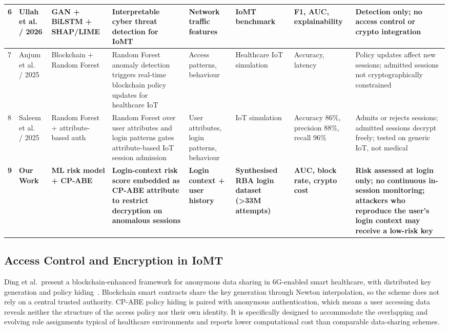 \begin{table}
{\begin{tabular}{|p{0.6cm}|p{2.5cm}|p{2.7cm}|p{3.2cm}|p{2.2cm}|p{2.2cm}|p{2.7cm}|p{2.5cm}|}
\hline
6 & Ullah et al.~\cite{ullah2025interpretable} / 2026 & GAN + BiLSTM + SHAP/LIME & Interpretable cyber threat detection for IoMT & Network traffic features & IoMT benchmark & F1, AUC, explainability & Detection only; no access control or crypto integration \\
\hline
7 & Anjum et al.~\cite{anjum2025blockchain} / 2025 & Blockchain + Random Forest & Random Forest anomaly detection triggers real-time blockchain policy updates for healthcare IoT & Access patterns, behaviour & Healthcare IoT simulation & Accuracy, latency & Policy updates affect new sessions; admitted sessions not cryptographically constrained \\
\hline
8 & Saleem et al.~\cite{saleem2025ml} / 2025 & Random Forest + attribute-based auth & Random Forest over user attributes and login patterns gates attribute-based IoT session admission & User attributes, login patterns, behaviour & IoT simulation & Accuracy 86\%, precision 88\%, recall 96\% & Admits or rejects sessions; admitted sessions decrypt freely; tested on generic IoT, not medical \\
\hline
\textbf{9} & \textbf{Our Work} & \textbf{ML risk model + CP-ABE} & \textbf{Login-context risk score embedded as CP-ABE attribute to restrict decryption on anomalous sessions} & \textbf{Login context + user history} & \textbf{Synthesised RBA login dataset ({>}33M attempts)} & \textbf{AUC, block rate, crypto cost} & \textbf{Risk assessed at login only; no continuous in-session monitoring; attackers who reproduce the user's login context may receive a low-risk key} \\
\hline
\end{tabular}
}%
\end{table}
\clearpage

\subsection{Access Control and Encryption in IoMT}
\label{sec:subsection_211}

Ding et al.\ present a blockchain-enhanced framework for anonymous data sharing in 6G-enabled smart healthcare, with distributed key generation and policy hiding~\cite{ding2026badsabe}. Blockchain smart contracts share the key generation through Newton interpolation, so the scheme does not rely on a central trusted authority. CP-ABE policy hiding is paired with anonymous authentication, which means a user accessing data reveals neither the structure of the access policy nor their own identity. It is specifically designed to accommodate the overlapping and evolving role assignments typical of healthcare environments and reports lower computational cost than comparable data-sharing schemes.

